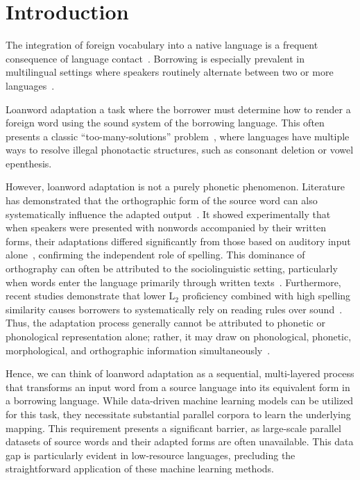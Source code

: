 \section{Introduction}

The integration of foreign vocabulary into a native language is a frequent
consequence of language contact~\cite{haugen1950}. Borrowing is especially
prevalent in multilingual settings where speakers routinely alternate between
two or more languages~\cite{haugen1950,uffman2015}.

Loanword adaptation a task where the borrower must determine how to render a
foreign word using the sound system of the borrowing language. This often
presents a classic ``too-many-solutions'' problem~\cite{kang2011}, where
languages have multiple ways to resolve illegal phonotactic structures, such as
consonant deletion or vowel epenthesis.

However, loanword adaptation is not a purely phonetic phenomenon. Literature
has demonstrated that the orthographic form of the source word can also
systematically influence the adapted output~\cite{vendelin2006,
    kang2011,daland2015}. It showed experimentally that when speakers were
presented with nonwords accompanied by their written forms, their adaptations
differed significantly from those based on auditory input
alone~\cite{vendelin2006}, confirming the independent role of spelling. This
dominance of orthography can often be attributed to the sociolinguistic
setting, particularly when words enter the language primarily through written
texts~\cite{uffman2015}. Furthermore, recent studies demonstrate that lower \(
\mathrm{L}_2 \) proficiency combined with high spelling similarity causes
borrowers to systematically rely on reading rules over sound~\cite{wang2025}.
Thus, the adaptation process generally cannot be attributed to phonetic or
phonological representation alone; rather, it may draw on phonological,
phonetic, morphological, and orthographic information
simultaneously~\cite{kang2011}.

Hence, we can think of loanword adaptation as a sequential, multi-layered
process that transforms an input word from a source language into its
equivalent form in a borrowing language. While data-driven machine learning
models can be utilized for this task, they necessitate substantial parallel
corpora to learn the underlying mapping. This requirement presents a
significant barrier, as large-scale parallel datasets of source words and their
adapted forms are often unavailable. This data gap is particularly evident in
low-resource languages, precluding the straightforward application of these
machine learning methods.

